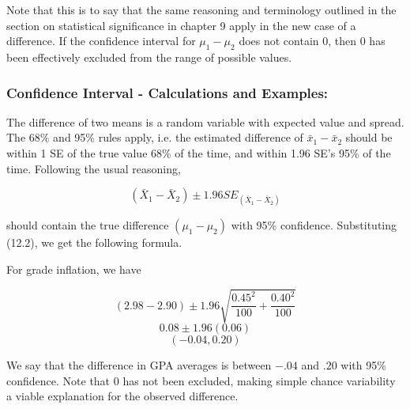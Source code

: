 \documentclass[11pt]{book}\usepackage[]{graphicx}\usepackage[]{color}
\begin{document}
Note that this is to say that the same reasoning and terminology outlined in the section on statistical significance in chapter 9 apply in the new case of a difference.  If the confidence interval for $\mu_1 - \mu_2$ does not contain 0, then 0 has been effectively excluded from the range of possible values.


\subsubsection{Confidence Interval - Calculations and Examples:}

The difference of two means is a random variable with expected value and spread.  The 68\% and 95\% rules apply, i.e. the estimated difference of $\bar{x}_1 - \bar{x}_2$ should be within 1 SE of the true value 68\% of the time, and within 1.96 SE's 95\% of the time.  Following the usual reasoning,    

\begin{equation*}
(\bar{X}_1 - \bar{X}_2) \pm 1.96 SE_{(\bar{X}_1 - \bar{X}_2)}
\end{equation*}

should contain the true difference $(\mu_1 - \mu_2)$ with 95\% confidence.  Substituting (12.2), we get the following formula.


For grade inflation, we have

\begin{equation*}
  (2.98 - 2.90) \pm 1.96 \sqrt{\frac{0.45^2}{100} + \frac{0.40^2}{100}}
\end{equation*}
\begin{equation*}
  0.08 \pm 1.96 (0.06)
\end{equation*}
\begin{equation*}
  (-0.04, 0.20)
\end{equation*}

We say that the difference in GPA averages is between $-.04$ and $.20$ with 95\% confidence.  Note that 0 has not been excluded, making simple chance variability a viable explanation for the observed difference. 
\end{document}
